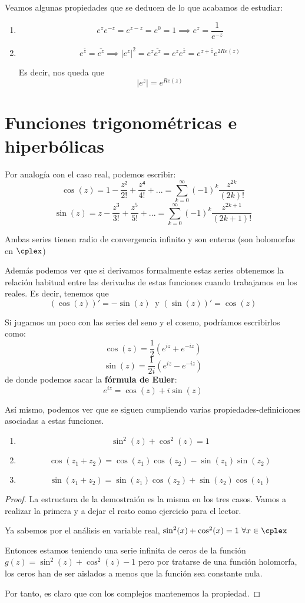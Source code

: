 \documentclass{apuntes}
\begin{document}
Veamos algunas propiedades que se deducen de lo que acabamos de estudiar:
\begin{enumerate}
\item \[e^ze^{-z}=e^{z-z}=e^0=1 \implies e^z=\frac{1}{e^{-z}}\]
\item \[e^{\bar{z}}=\overline{e^z} \implies |e^z|^2=e^z\overline{e^z} = e^z e^{\bar{z}}=e^{z+\bar{z}} e^{2 Re(z)}\]

Es decir, nos queda que
\[|e^z|=e^{Re(z)}\]
\end{enumerate}


\section{Funciones trigonométricas e hiperbólicas}
Por analogía con el caso real, podemos escribir:
\[\cos(z)=1-\frac{z²}{2!}+\frac{z⁴}{4!}+... = \sum_{k=0}^{\infty}(-1)^k\frac{z^{2k}}{(2k)!}\]
\[\sin(z)=z-\frac{z^3}{3!}+\frac{z^5}{5!}+... = \sum_{k=0}^{\infty}(-1)^k\frac{z^{2k+1}}{(2k+1)!}\]

Ambas series tienen radio de convergencia infinito y son enteras (son holomorfas en $\cplex$)

Además podemos ver que si derivamos formalmente estas series obtenemos la relación habitual entre las derivadas de estas funciones cuando trabajamos en los reales. Es decir, tenemos que
\[(\cos(z))'=-\sin(z) \ \text{ y } (\sin(z))'=\cos(z)\]

Si jugamos un poco con las series del seno y el coseno, podríamos escribirlos como:
\[\cos(z)=\frac{1}{2}\left( e^{iz}+e^{-iz}\right)\]
\[\sin(z)=\frac{1}{2i}\left( e^{iz}-e^{-iz}\right)\]
de donde podemos sacar la \textbf{fórmula de Euler}:
\[e^{iz}=\cos(z)+i\sin(z)\]

Así mismo, podemos ver que se siguen cumpliendo varias propiedades-definiciones asociadas a estas funciones.
\begin{enumerate}
\item
\[\sin^2(z)+\cos^2(z) =1\]
\item
\[\cos(z_1+z_2)=\cos(z_1)\cos(z_2)-\sin(z_1)\sin(z_2)\]
\item
\[\sin(z_1+z_2)=\sin(z_1)\cos(z_2)+\sin(z_2)\cos(z_1)\]
\end{enumerate}
\begin{proof}
La estructura de la demostraión es la misma en los tres casos. Vamos a realizar la primera y a dejar el resto como ejercicio para el lector.

Ya sabemos por el análisis en variable real, $\sin^2(x)+\cos^2(x)=1 \ \forall x \in \cplex$

Entonces estamos teniendo una serie infinita de ceros de la función
$g(z)=\sin^2(z)+\cos^2(z)-1$
pero por tratarse de una función holomorfa, los ceros han de ser aislados a menos que la función sea constante nula.

Por tanto, es claro que con los complejos mantenemos la propiedad.
\end{proof}
\end{document}
